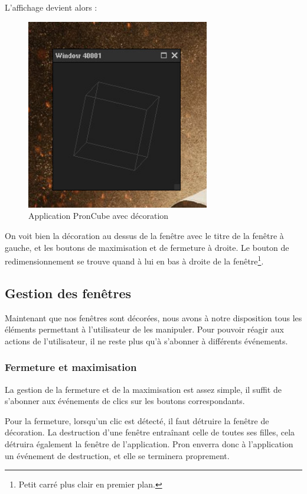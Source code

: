 L'affichage devient alors :

\begin{figure}[H]
  \centering
  \includegraphics[width=8cm]{images/pron_cube_avec_decoration.jpg}
  \caption{Application PronCube avec décoration}
  \label{fig:pron_cube_avec_decoration}
\end{figure}

On voit bien la décoration au dessus de la fenêtre avec le titre de la fenêtre à gauche, et les boutons de maximisation et de fermeture à droite.
Le bouton de redimensionnement se trouve quand à lui en bas à droite de la fenêtre\footnote{Petit carré plus clair en premier plan.}.

\subsection{Gestion des fenêtres}
\label{GestionFenetres}

Maintenant que nos fenêtres sont décorées, nous avons à notre disposition tous les éléments permettant à l'utilisateur de les manipuler.
Pour pouvoir réagir aux actions de l'utilisateur, il ne reste plus qu'à s'abonner à différents événements.

\subsubsection{Fermeture et maximisation}

La gestion de la fermeture et de la maximisation est assez simple, il suffit de s'abonner aux événements de clics sur les boutons correspondants.

Pour la fermeture, lorsqu'un clic est détecté, il faut détruire la fenêtre de décoration.
La destruction d'une fenêtre entraînant celle de toutes ses filles, cela détruira également la fenêtre de l'application.
Pron enverra donc à l'application un événement de destruction, et elle se terminera proprement.

